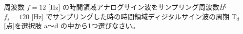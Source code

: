 周波数 $f = 12$ [Hz] の時間領域アナログサイン波をサンプリング周波数が $f_s = 120$ [Hz] でサンプリングした時の時間領域ディジタルサイン波の周期 $\textrm{T}_d$ [点]を選択肢 a〜d の中から1つ選びなさい。

